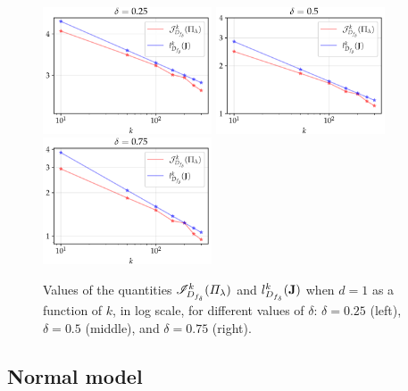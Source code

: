\begin{figure}[h]
    \centering
    \includegraphics[width=5cm]{figures/va-rp/conv-rates-025.pdf}
    \includegraphics[width=5cm]{figures/va-rp/conv-rates-05.pdf}
    \includegraphics[width=5cm]{figures/va-rp/conv-rates-075.pdf}
    \caption{Values of the quantities $\mathscr{I}^k_{D_{f_\delta}}(\varPi_\lambda)$ and $l^k_{D_{f_\delta}}(\mathbf{J})$ when $d=1$ as a function of $k$, in log scale, for different values of $\delta$: $\delta=0.25$ (left), $\delta=0.5$ (middle), and $\delta=0.75$ (right).}
    \label{fig:VARP:rateslIM}
\end{figure}








\subsection{Normal model}


